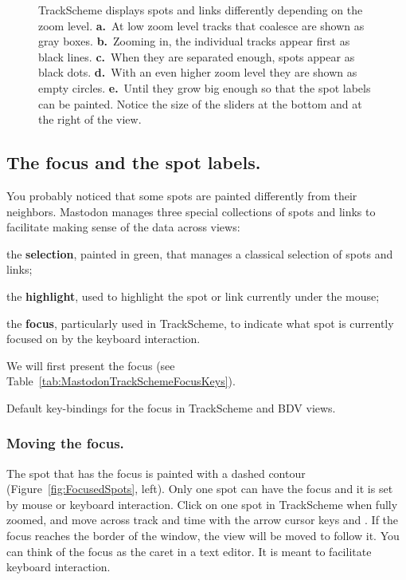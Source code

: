 \begin{figure}
    \caption{TrackScheme displays spots and links differently depending on the zoom level. \textbf{a.}~At low zoom level tracks that coalesce are shown as gray boxes. \textbf{b.}~Zooming in, the individual tracks appear first as black lines. \textbf{c.}~When they are separated enough, spots appear as black dots. \textbf{d.}~With an even higher zoom level they are shown as empty circles. \textbf{e.}~Until they grow big enough so that the spot labels can be painted. Notice the size of the sliders at the bottom and at the right of the view.}
    \label{fig:TrackSchemeZoomLevel}
\end{figure}  

\subsection{The focus and the spot labels.}

You probably noticed that some spots are painted differently from their neighbors. 
Mastodon manages three special collections of spots and links to facilitate making sense of the data across views:
\begin{myitemize}
    \item the \textbf{selection}, painted in green, that manages a classical selection of spots and links;
    \item the \textbf{highlight}, used to highlight the spot or link currently under the mouse;
    \item the \textbf{focus}, particularly used in TrackScheme, to indicate what spot is currently focused on by the keyboard interaction.
\end{myitemize}

\noindent We will first present the focus (see Table~\ref{tab:MastodonTrackSchemeFocusKeys}). 

\begin{table}[htbp]
    \centering
    \caption{Default key-bindings for the focus in TrackScheme and BDV views.}
    
    \label{tab:MastodonTrackSchemeFocusKeys}
\end{table}


\subsubsection{Moving the focus.}

The spot that has the focus is painted with a dashed contour (Figure~\ref{fig:FocusedSpots}, left). 
Only one spot can have the focus and it is set by mouse or keyboard interaction.
Click on one spot in TrackScheme when fully zoomed, and move across track and time with the arrow cursor keys \keys{\arrowkeyleft} \keys{\arrowkeyright} \keys{\arrowkeyup} and \keys{\arrowkeydown}.
If the focus reaches the border of the window, the view will be moved to follow it.
You can think of the focus as the caret in a text editor. 
It is meant to facilitate keyboard interaction.

